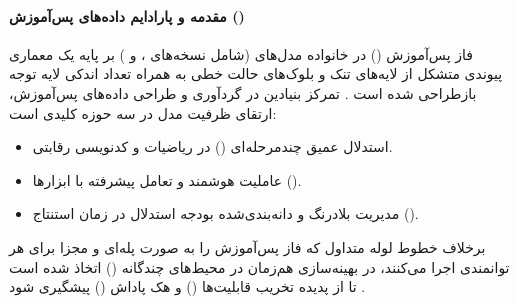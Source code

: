 \item {}

\paragraph*{مقدمه و پارادایم داده‌های پس‌آموزش ()}
فاز پس‌آموزش () در خانواده مدل‌های  (شامل نسخه‌های ،  و ) بر پایه یک معماری پیوندی متشکل از لایه‌های تنک  و بلوک‌های حالت خطی  به همراه تعداد اندکی لایه توجه بازطراحی شده است \cite{waleffe2024mamba, dao2024transformers}. تمرکز بنیادین در گردآوری و طراحی داده‌های پس‌آموزش، ارتقای ظرفیت مدل در سه حوزه کلیدی است:
\begin{itemize}
    \item استدلال عمیق چندمرحله‌ای () در ریاضیات و کدنویسی رقابتی.
    \item عاملیت هوشمند و تعامل پیشرفته با ابزارها ().
    \item مدیریت بلادرنگ و دانه‌بندی‌شده بودجه استدلال در زمان استنتاج ().
\end{itemize}
برخلاف خطوط لوله متداول که فاز پس‌آموزش را به صورت پله‌ای و مجزا برای هر توانمندی اجرا می‌کنند، در  بهینه‌سازی هم‌زمان در محیط‌های چندگانه () اتخاذ شده است تا از پدیده تخریب قابلیت‌ها () و هک پاداش () پیشگیری شود \cite{deepseek2025v3a, nvidia2025nemotron2}.

